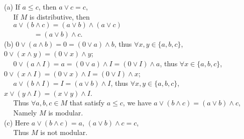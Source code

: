 \documentclass[11pt, a4paper, UTF8]{ctexart}
\begin{document}
\begin{solution}
  (a) If $a \leq c$, then $a \vee c = c$,\\
  $~~~~~~$If $M$ is distributive, then\\
  $~~~~~~a \vee (b \wedge c) = (a \vee b) \wedge (a \vee c)$\\
  $~~~~~~~~~~~~~~~~~~~= (a \vee b) \wedge c$.\\
  (b) $0 \vee (a \wedge b) = 0 = (0 \vee a) \wedge b$, thus $\forall x,y \in \{ a,b,c \}$, 
  $0 \vee (x \wedge y) = (0 \vee x) \wedge y$;\\
  $~~~~~~0 \vee (a \wedge I) = a = (0 \vee a) \wedge I = (0 \vee I) \wedge a$, 
  thus $\forall x \in \{ a,b,c \}$, $0 \vee (x \wedge I) = (0 \vee x) \wedge I = (0 \vee I) \wedge x$;\\
  $~~~~~~a \vee (b \wedge I) = I = (a \vee b) \wedge I$, thus $\forall x,y \in \{ a,b,c \}$, 
  $x \vee (y \wedge I) = (x \vee y) \wedge I$.\\
  $~~~~~~$Thus $\forall a,b,c \in M$ that satisfy $a \leq c$, we have $a \vee (b \wedge c) = (a \vee b) \wedge c$,\\
  $~~~~~~$Namely $M$ is modular.\\
  (c) Here $a \vee (b \wedge c) = a$, $(a \vee b) \wedge c = c$,\\
  $~~~~~~$Thus $M$ is not modular.
\end{solution}




\beginattch
\end{document}
